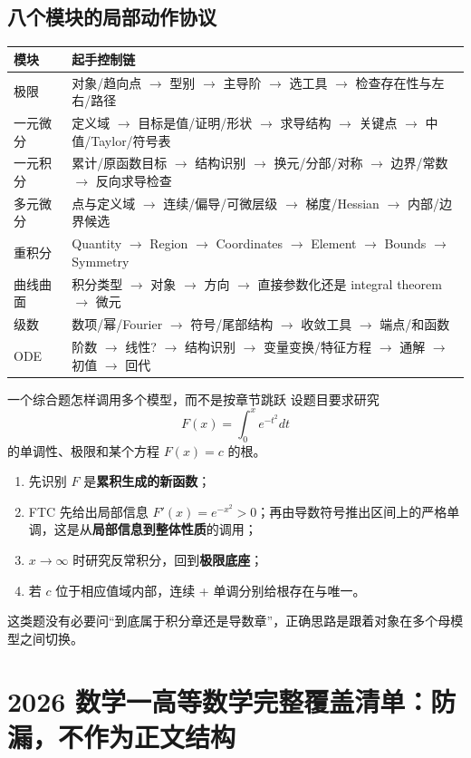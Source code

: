\documentclass[11pt,a4paper,openany]{ctexbook}
\newcommand{\key}[1]{\textbf{\color{deep}#1}}
\begin{document}
\section{八个模块的局部动作协议}
\begin{longtable}{L{2.6cm}L{\dimexpr\linewidth-2.77cm\relax}}
\toprule
\textbf{模块} & \textbf{起手控制链}\\
\midrule
极限 & 对象/趋向点 $\to$ 型别 $\to$ 主导阶 $\to$ 选工具 $\to$ 检查存在性与左右/路径\\
一元微分 & 定义域 $\to$ 目标是值/证明/形状 $\to$ 求导结构 $\to$ 关键点 $\to$ 中值/Taylor/符号表\\
一元积分 & 累计/原函数目标 $\to$ 结构识别 $\to$ 换元/分部/对称 $\to$ 边界/常数 $\to$ 反向求导检查\\
多元微分 & 点与定义域 $\to$ 连续/偏导/可微层级 $\to$ 梯度/Hessian $\to$ 内部/边界候选\\
重积分 & Quantity $\to$ Region $\to$ Coordinates $\to$ Element $\to$ Bounds $\to$ Symmetry\\
曲线曲面 & 积分类型 $\to$ 对象 $\to$ 方向 $\to$ 直接参数化还是 integral theorem $\to$ 微元\\
级数 & 数项/幂/Fourier $\to$ 符号/尾部结构 $\to$ 收敛工具 $\to$ 端点/和函数\\
ODE & 阶数 $\to$ 线性? $\to$ 结构识别 $\to$ 变量变换/特征方程 $\to$ 通解 $\to$ 初值 $\to$ 回代\\
\bottomrule
\end{longtable}

\begin{examplebox}{一个综合题怎样调用多个模型，而不是按章节跳跃}
设题目要求研究
\[
F(x)=\int_0^x e^{-t^2}dt
\]
的单调性、极限和某个方程 $F(x)=c$ 的根。
\begin{enumerate}
  \item 先识别 $F$ 是\key{累积生成的新函数}；
  \item FTC 先给出局部信息 $F'(x)=e^{-x^2}>0$；再由导数符号推出区间上的严格单调，这是从\key{局部信息到整体性质}的调用；
  \item $x\to\infty$ 时研究反常积分，回到\key{极限底座}；
  \item 若 $c$ 位于相应值域内部，连续 + 单调分别给根存在与唯一。
\end{enumerate}
这类题没有必要问“到底属于积分章还是导数章”，正确思路是跟着对象在多个母模型之间切换。
\end{examplebox}

\appendix
\chapter{2026 数学一高等数学完整覆盖清单：防漏，不作为正文结构}
\end{document}
